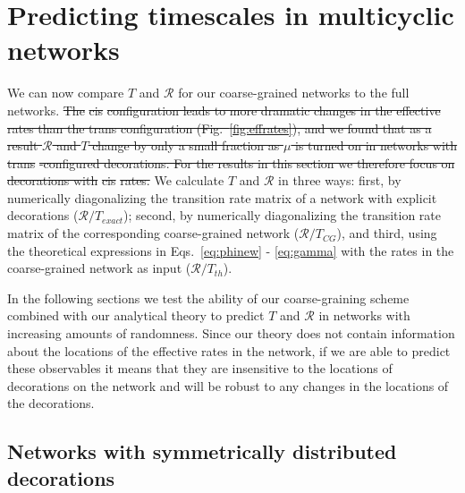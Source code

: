\documentclass[amsmath, preprintnumbers, 10pt, twocolumn, pre, bibliograpy]{revtex4-1}
\newcommand{\R}{\mathcal R}
\providecommand{\DIFdel}[1]{{\protect\color{red}\sout{#1}}}                      %
\providecommand{\DIFdelbegin}{} %
\providecommand{\DIFdelend}{} %
\newcommand{\DIFscaledelfig}{0.5}
\newlength{\DIFdelgraphicswidth} %
\newlength{\DIFdelgraphicsheight} %
\newcommand{\DIFdelincludegraphics}[2][]{%
\sbox{\DIFdelgraphicsbox}{\DIFOincludegraphics[#1]{#2}}%
\settoboxwidth{\DIFdelgraphicswidth}{\DIFdelgraphicsbox} %
\settoboxtotalheight{\DIFdelgraphicsheight}{\DIFdelgraphicsbox} %
\scalebox{\DIFscaledelfig}{%
\parbox[b]{\DIFdelgraphicswidth}{\usebox{\DIFdelgraphicsbox}\\[-\baselineskip] \rule{\DIFdelgraphicswidth}{0em}}\llap{\resizebox{\DIFdelgraphicswidth}{\DIFdelgraphicsheight}{%
\setlength{\unitlength}{\DIFdelgraphicswidth}%
\begin{picture}(1,1)%
\thicklines\linethickness{2pt} %
{\color[rgb]{1,0,0}\put(0,0){\framebox(1,1){}}}%
{\color[rgb]{1,0,0}\put(0,0){\line( 1,1){1}}}%
{\color[rgb]{1,0,0}\put(0,1){\line(1,-1){1}}}%
\end{picture}%
}\hspace*{3pt}}} %
} %
\DeclareRobustCommand{\DIFdelbegin}{\DIFOdelbegin \let\includegraphics\DIFdelincludegraphics} %
\DeclareRobustCommand{\DIFdelend}{\DIFOaddend \let\includegraphics\DIFOincludegraphics} %
\begin{document}
\section{Predicting timescales in multicyclic networks}\label{timescales}

We can now compare $T$ and $\R$ for our coarse-grained networks to the full networks.  \DIFdelbegin \DIFdel{The }%
\DIFdel{cis}%
\DIFdel{configuration leads to more dramatic changes in the effective rates than the trans configuration (Fig.~\ref{fig:effrates}), and we found that as a result $\R$ and $T$ change by only a small fraction as $\mu$ is turned on in networks with }%
\DIFdel{trans}%
\DIFdel{-configured decorations. For the results in this section we therefore focus on decorations with }%
\DIFdel{cis}%
\DIFdel{rates. }\DIFdelend We calculate $T$ and $\R$ in three ways: first, by numerically diagonalizing the transition rate matrix of a network with explicit decorations ($\R/T_{exact}$); second, by numerically diagonalizing the transition rate matrix of the corresponding coarse-grained network ($\R/T_{CG}$), and third, using the theoretical expressions in Eqs.~\ref{eq:phinew} - \ref{eq:gamma} with the rates in the coarse-grained network as input ($\R/T_{th}$).

In the following sections we test the ability of our coarse-graining scheme combined with our analytical theory to predict $T$ and $\R$ in networks with increasing amounts of randomness. Since our theory does not contain information about the locations of the effective rates in the network, if we are able to predict these observables it means that they are insensitive to the locations of decorations on the network and will be robust to any changes in the locations of the decorations.  %

\subsection{Networks with symmetrically distributed decorations}
\end{document}
